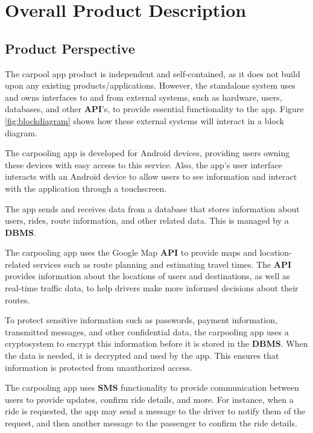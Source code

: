 \documentclass[]{article}
\begin{document}

\section{Overall Product Description}
\label{sec:overall_description}

\subsection{Product Perspective}
\label{sub:product_perspective}
The carpool app product is independent and self-contained, as it does not build upon any existing products/applications. However, the standalone system uses and owns interfaces to and from external systems, such as hardware, users, databases, and other \textbf{API}'s, to provide essential functionality to the app. Figure \ref{fig:blockdiagram} shows how these external systems will interact in a block diagram.

The carpooling app is developed for Android devices, providing users owning these devices with easy access to this service. Also, the app's user interface interacts with an Android device to allow users to see information and interact with the application through a touchscreen.

The app sends and receives data from a database that stores information about users, rides, route information, and other related data. This is managed by a \textbf{DBMS}.

The carpooling app uses the Google Map \textbf{API} to provide maps and location-related services such as route planning and estimating travel times. The \textbf{API} provides information about the locations of users and destinations, as well as real-time traffic data, to help drivers make more informed decisions about their routes.

To protect sensitive information such as passwords, payment information, transmitted messages, and other confidential data, the carpooling app uses a cryptosystem to encrypt this information before it is stored in the \textbf{DBMS}. When the data is needed, it is decrypted and used by the app. This ensures that information is protected from unauthorized access.

The carpooling app uses \textbf{SMS} functionality to provide communication between users to provide updates, confirm ride details, and more. For instance, when a ride is requested, the app may send a message to the driver to notify them of the request, and then another message to the passenger to confirm the ride details.
\end{document}
